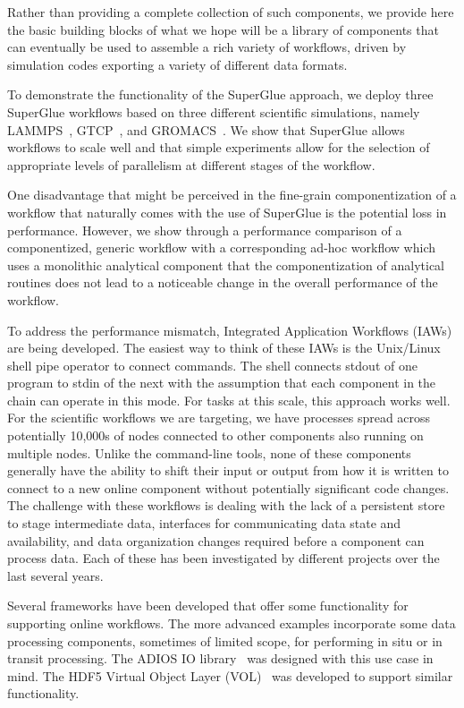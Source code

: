 Rather than providing a complete collection of such components,
we provide here the basic building
blocks of what we hope will be a library of components that can
eventually be used to assemble
a rich variety of workflows, driven by simulation codes
exporting a variety of different data formats.

To demonstrate the functionality of the SuperGlue approach,
we deploy three SuperGlue workflows based on three different
scientific simulations, namely
LAMMPS~\cite{plimpton:1997:lammps},
GTCP~\cite{lin:gtc},
and GROMACS~\cite{hess2008gromacs}.
We show that SuperGlue allows workflows to scale well and that
simple experiments allow for the selection of
appropriate levels of parallelism at different
stages of the workflow.

One disadvantage that might be perceived in the fine-grain componentization
of a workflow that naturally comes with the use of SuperGlue
is the potential loss in performance.
However, we show through a performance comparison of
a componentized, generic workflow with a corresponding
ad-hoc workflow which uses a monolithic analytical component
that the componentization of analytical routines
does not lead to a noticeable change in the
overall performance of the workflow.


\fi


To address the performance mismatch, Integrated Application Workflows (IAWs)
are being developed. The easiest way to think of these IAWs is the Unix/Linux
shell pipe operator to connect commands. The shell connects stdout of one
program to stdin of the next with the assumption that each component in the
chain can operate in this mode. For tasks at this scale, this approach works
well. For the scientific workflows we are targeting, we have processes spread
across potentially 10,000s of nodes connected to other components also running
on multiple nodes. Unlike the command-line tools, none of these components
generally have the ability to shift their input or output from how it is
written to connect to a new online component without potentially significant
code changes. The challenge with these workflows is dealing with the lack of a
persistent store to stage intermediate data, interfaces for communicating data
state and availability, and data organization changes required before a
component can process data.  Each of these has been investigated by different
projects over the last several years.

Several frameworks have been developed that offer some functionality for
supporting online workflows. The more advanced examples incorporate some data
processing components, sometimes of limited scope, for performing in situ or in
transit processing. The ADIOS IO library~\cite{lofstead:2009:adaptable} was designed with
this use case in mind. The HDF5 Virtual Object Layer
(VOL)~\cite{chaarawi:2013:hdf5-vol} was developed to support similar
functionality.

